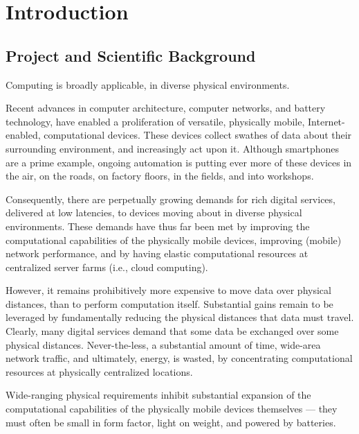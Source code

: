 \section{Introduction}

\subsection{Project and Scientific Background}

Computing is broadly applicable, in diverse physical environments.

Recent advances in computer architecture, computer networks, and
battery technology, have enabled a proliferation of versatile,
physically mobile, Internet-enabled, computational devices. These
devices collect swathes of data about their surrounding environment,
and increasingly act upon it. Although smartphones are a prime
example, ongoing automation is putting ever more of these devices in
the air\cite{economist2017drones}, on the
roads\cite{economist2018cars}, on factory
floors\cite{spiegel2016industrie, spiegel2017industrie}, in the
fields\cite{ng2017smartfarming}, and into
workshops\cite{economist2017jets}.

Consequently, there are perpetually growing demands for rich digital
services, delivered at low latencies, to devices moving about in
diverse physical environments. These demands have thus far been met by
improving the computational capabilities of the physically mobile
devices, improving (mobile) network performance, and by having elastic
computational resources at centralized server farms (i.e., cloud
computing).

However, it remains prohibitively more expensive to move data over
physical distances, than to perform computation itself. Substantial
gains remain to be leveraged by fundamentally reducing the physical
distances that data must travel. Clearly, many digital services demand
that some data be exchanged over some physical distances.
Never-the-less, a substantial amount of time, wide-area network
traffic, and ultimately, energy, is
wasted\cite{2008-Greening-the-Internet,
2015-Distributed-Cloud-Dagstuhl,
2016-Fog-Computing-May-Help-to-Save-Energy-in-Cloud-Computing,
2017-Greening-IoT-with-Fog}, by concentrating computational resources
at physically centralized locations.

Wide-ranging physical requirements inhibit substantial expansion of
the computational capabilities of the physically mobile devices
themselves --- they must often be small in form factor, light on
weight, and powered by batteries.

